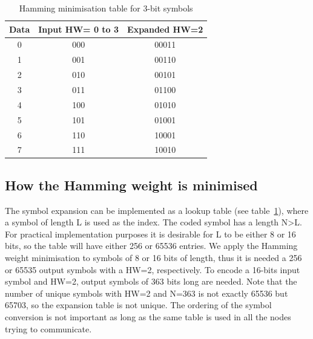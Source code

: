 \documentclass[a4paper,10pt]{report}
\begin{document}
\begin{table}[t]
\begin{center}
\begin{tabular}{c c c}
Data & Input HW= 0 to 3 & Expanded HW=2\\
\hline\hline
0 & 000 & 00011\\
1 & 001 & 00110\\
2 & 010 & 00101\\
3 & 011 & 01100\\
4 & 100 & 01010\\
5 & 101 & 01001\\
6 & 110 & 10001\\
7 & 111 & 10010\\
\end{tabular}
\caption{Hamming minimisation table for 3-bit symbols}
\label{hwtable}
\end{center}
 \end{table}
 
\subsection{How the Hamming weight is minimised}
The symbol expansion can be implemented as a lookup table (see table~\ref{hwtable}), where a symbol of length L is used as the index.
The coded symbol has a length N\textgreater L.
For practical implementation purposes it is desirable for L to be either 8 or 16 bits, so the table will have either 256 or 65536 entries.
We apply the Hamming weight minimisation to symbols of 8 or 16 bits of length, thus it is needed a 256 or 65535 output symbols with a HW=2, respectively.
To encode a 16-bits input symbol and HW=2, output symbols of 363 bits long are needed.
Note that the number of unique symbols with HW=2 and N=363 is not exactly 65536 but 65703, so the expansion table is not unique.
The ordering of the symbol conversion is not important as long as the same table is used in all the nodes trying to communicate.
\end{document}
